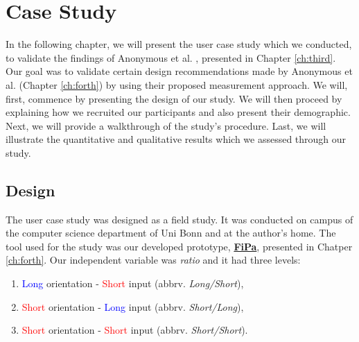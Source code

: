 
\chapter{Case Study}\label{ch:fifth}

In the following chapter, we will present the user case study which we conducted, to validate the findings of Anonymous et al. \cite{anonymous}, presented in Chapter \ref{ch:third}. Our goal was to validate certain design recommendations made by Anonymous et al. (Chapter \ref{ch:forth}) by using their proposed measurement approach. We will, first, commence by presenting the design of our study. We will then proceed by explaining how we recruited our participants and also present their demographic. Next, we will provide a walkthrough of the study's procedure. Last, we will illustrate the quantitative and qualitative results which we assessed through our study. 



\section{Design} \label{5.1}

The user case study was designed as a field study. It was conducted on campus of the computer science department of Uni Bonn and at the author's home. The tool used for the study was our developed prototype, \underline{\textbf{FiPa}}, presented in Chatper \ref{ch:forth}. Our independent variable was \textit{ratio} and it had three levels:
\begin{enumerate}
    \item \textcolor{blue}{Long} orientation - \textcolor{red}{Short} input (abbrv. \textit{Long/Short}), 
    \item \textcolor{red}{Short} orientation - \textcolor{blue}{Long} input (abbrv. \textit{Short/Long}), 
    \item \textcolor{red}{Short} orientation - \textcolor{red}{Short} input (abbrv. \textit{Short/Short}). 
\end{enumerate}

